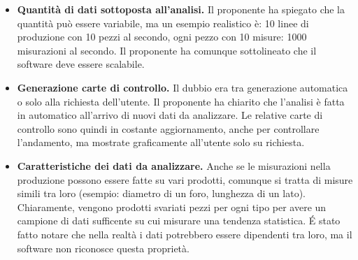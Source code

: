 \documentclass[a4paper, 12pt]{article}
\begin{document}
\begin{itemize}

\item \textbf{Quantità di dati sottoposta all'analisi.} Il proponente ha spiegato che la quantità può essere variabile, ma un esempio realistico è: 10 linee di produzione con 10 pezzi al secondo, ogni pezzo con 10 misure: 1000 misurazioni al secondo. Il proponente ha comunque sottolineato che il software deve essere scalabile.

\item \textbf{Generazione carte di controllo.} Il dubbio era tra generazione automatica o solo alla richiesta dell'utente. Il proponente ha chiarito che l'analisi è fatta in automatico all'arrivo di nuovi dati da analizzare. Le relative carte di controllo sono quindi in costante aggiornamento, anche per controllare l'andamento, ma mostrate graficamente all'utente solo su richiesta.

\item \textbf{Caratteristiche dei dati da analizzare.} Anche se le misurazioni nella produzione possono essere fatte su vari prodotti, comunque si tratta di misure simili tra loro (esempio: diametro di un foro, lunghezza di un lato). Chiaramente, vengono prodotti svariati pezzi per ogni tipo per avere un campione di dati sufficente su cui misurare una tendenza statistica. É stato fatto notare che nella realtà i dati potrebbero essere dipendenti tra loro, ma il software non riconosce questa proprietà.

\end{itemize}
\end{document}
